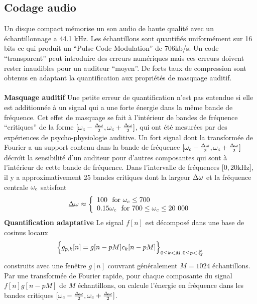 \subsection{Codage audio}
\label{transparent-audio}

Un disque compact m\'emorise un son audio de haute qualit\'e
avec un \'echantillonnage a
44.1 kHz. Les \'echantillons sont quantifi\'es uniform\'ement sur
16 bits ce qui produit un
``Pulse Code Modulation'' de 706kb/s.
Un code ``transparent'' peut introduire des erreurs num\'eriques
mais ces erreurs doivent rester inaudibles pour un
auditeur ``moyen''.
De forts taux de compression sont obtenus en adaptant la
quantification aux propri\'et\'es de masquage auditif.\\
\\
{\bf Masquage auditif}
Une petite erreur de quantification n'est pas entendue si
elle est additionn\'ee \`a un signal qui a une forte \'energie
dans la m\^eme bande de fr\'equence.
Cet effet de masquage se fait \`a l'int\'erieur de bandes
de fr\'equence ``critiques'' de la forme
$[{\omega}_c - \frac {\Delta {\omega}} 2,{\omega}_c + \frac {\Delta {\omega}} 2]$,
qui ont \'et\'e mesur\'ees
par des exp\'eriences de psycho-physiologie
auditive.
Un fort signal dont la transform\'ee de Fourier a un support
contenu dans la bande de fr\'equence
$[{\omega}_c - \frac {\Delta {\omega}} 2,{\omega}_c + \frac {\Delta {\omega}} 2]$
d\'ecro\^{\i}t la sensibilit\'e d'un auditeur
pour d'autres composantes qui sont \`a l'int\'erieur de cette
bande de fr\'equence.
Dans l'intervalle de fr\'equences
$[0,20$kHz$]$, il y a approximativement
25 bandes critiques dont la largeur
$\Delta {\omega}$ et la fr\'equence centrale ${\omega}_c$ satisfont
\begin{equation}
\label{criticalband}
{\Delta {\omega}} \approx
\left\{
\begin{array}{ll}
100 ~~\mbox{for ${\omega}_c \leq 700$}\\
0.15 {\omega}_c ~~\mbox{for $700 \leq {\omega}_c \leq 20~000$}
\end{array}
\right.
\end{equation}
{\bf Quantification adaptative}
Le signal $f[n]$ est d\'ecompos\'e dans une base de cosinus locaux
\[
\Bigl\{ g_{p,k} [n] = g[n-pM] c_k [n-pM]  \Bigr\}_
{{ 0 \leq k < M}, 0 \leq p < \frac N M}
\]
construits avec une fen\^etre $g[n]$ couvrant g\'en\'eralement
$M = 1024$ \'echantillons.
Par une transform\'ee de Fourier rapide, pour chaque
composante du signal $f[n] g[n-pM]$ de $M$ \'echantillons,
on calcule l'\'energie en fr\'equence dans les
bandes critiques
$[{\omega}_c - \frac{\Delta {\omega}} 2, {\omega}_c + \frac{\Delta {\omega}} 2 ]$.
